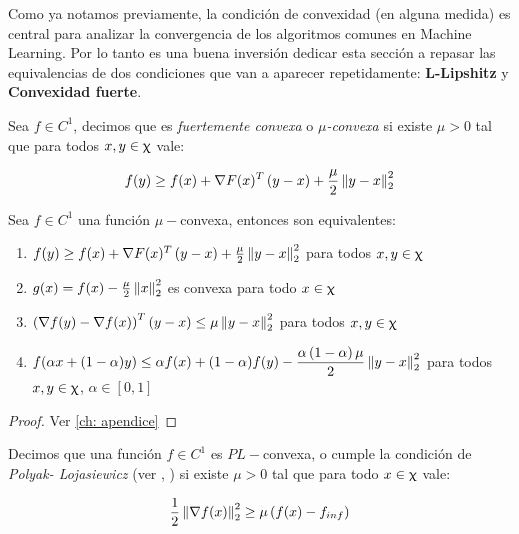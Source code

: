 Como ya notamos previamente, la condici\'on de convexidad (en alguna medida) es central para analizar la convergencia de los algoritmos comunes en Machine Learning. Por lo tanto es una buena inversi\'on dedicar esta secci\'on a repasar las equivalencias de dos condiciones que van a aparecer repetidamente: \textbf{L-Lipshitz} y \textbf{Convexidad fuerte}.

\begin{definition}
	\label{def: Fuertemente convexa}
	Sea $f \in C^1$, decimos que es \textit{fuertemente convexa} o $\mu$\textit{-convexa} si existe $\mu > 0$ tal que para todos $x,y \in \upchi$ vale:
	
	\begin{equation}
		f(y) \geq f(x) + \nabla F(x)^T\left(y-x\right) + \frac{\mu}{2} \left\lVert y-x\right\rVert_2^2
	\end{equation}
\end{definition}

\begin{proposition}
	\label{prop: equivalencias convexidad fuerte}
	Sea $f \in C^1$ una funci\'on $\mu-$convexa, entonces son equivalentes:
	
	\begin{enumerate}
		\item $f(y) \geq f(x) + \nabla F(x)^T\left(y-x\right) + \frac{\mu}{2} \left\lVert y-x\right\rVert_2^2$ para todos $x,y \in \upchi$
		\item $g(x) = f(x) - \frac{\mu}{2} \left\lVert x\right\rVert_2^2$ es convexa para todo $x \in \upchi$
		\item $\left(\nabla f(y) - \nabla f(x)\right)^T \left(y-x\right) \leq \mu \left\lVert y-x\right\rVert_2^2$ para todos $x,y \in \upchi$
		\item $f(\alpha x + (1-\alpha)y) \leq \alpha f(x) + (1-\alpha) f(y) - \dfrac{\alpha \left(1 - \alpha \right) \mu}{2}\left\lVert y-x\right\rVert_2^2$ para  todos $x,y \in \upchi$, $\alpha \in [0,1]$
	\end{enumerate}
	
\end{proposition}

\begin{proof}
	Ver \ref{ch: apendice}
\end{proof}

\begin{definition}
	\label{def: Condicion PL}
	Decimos que una funci\'on $f \in C^1$ es $PL-$convexa, o cumple la condici\'on de \textit{Polyak- Lojasiewicz} (ver \cite{polyak:1963}, \cite{lojasiewicz:1963}) si existe $\mu >0$ tal que para todo $x \in \upchi$ vale:
	
	\begin{equation}
		\frac{1}{2} \left\lVert\nabla f(x)\right\rVert^2_2 \geq \mu \left(f(x) - f_{inf}\right)
	\end{equation}
	
\end{definition}

